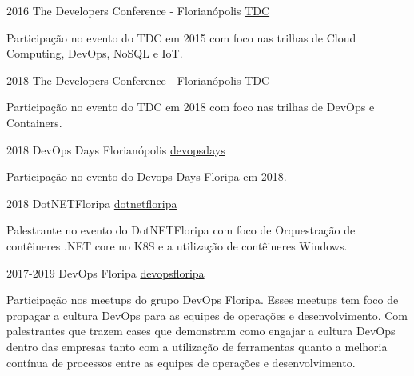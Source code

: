 \documentclass[]{friggeri-cv} %
\begin{document}
\begin{entrylist}
\entry
{2016}
{The Developers Conference - Florianópolis}
{\href{https://thedevconf.com/tdc/2016/florianopolis/trilhas}{TDC}}
{
    
    Participação no evento do TDC em 2015 com foco nas trilhas de Cloud Computing, DevOps, NoSQL e IoT.

}
\end{entrylist}

\begin{entrylist}
\entry
{2018}
{The Developers Conference - Florianópolis}
{\href{https://thedevconf.com/tdc/2018/florianopolis/trilhas}{TDC}}
{
    
    Participação no evento do TDC em 2018 com foco nas trilhas de DevOps e Containers.

}
\end{entrylist}

\begin{entrylist}
\entry
{2018}
{DevOps Days Florianópolis}
{\href{https://devopsdays.org/events/2018-florianopolis/program}{devopsdays}}
{
    
    Participação no evento do Devops Days Floripa em 2018.

}
\end{entrylist}

\begin{entrylist}
\entry
{2018}
{DotNETFloripa}
{\href{https://www.meetup.com/DotNetFloripa/}{dotnetfloripa}}
{
    
    Palestrante no evento do DotNETFloripa com foco de Orquestração de contêineres .NET core no K8S e a utilização de contêineres Windows.

}
\end{entrylist}

\begin{entrylist}
\entry
{2017-2019}
{DevOps Floripa}
{\href{https://www.meetup.com/DevOps-Florianopolis/}{devopsfloripa}}
{
    
    Participação nos meetups do grupo DevOps Floripa. Esses meetups tem foco de propagar a cultura DevOps para as equipes de operações e 
    desenvolvimento. Com palestrantes que trazem cases que demonstram como engajar a cultura DevOps dentro das empresas tanto com
    a utilização de ferramentas quanto a melhoria contínua de processos entre as equipes de operações e desenvolvimento.

}
\end{entrylist}
\end{document}
